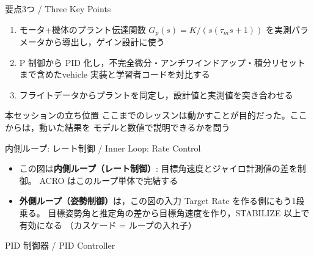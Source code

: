 \begin{frame}{要点3つ / Three Key Points}
  \begin{enumerate}
    \item モータ+機体のプラント伝達関数 $G_p(s) = K/(s(\tau_m s+1))$ を実測パラメータから導出し，ゲイン設計に使う
    \item P 制御から PID 化し，不完全微分・アンチワインドアップ・積分リセットまで含めたvehicle 実装と学習者コードを対比する
    \item フライトデータからプラントを同定し，設計値と実測値を突き合わせる
  \end{enumerate}

  \vspace{0.5em}

  \begin{alertblock}{本セッションの立ち位置}
    \small
    ここまでのレッスンは動かすことが目的だった。ここからは，動いた結果を
    モデルと数値で説明できるかを問う
  \end{alertblock}
\end{frame}

\begin{frame}{内側ループ: レート制御 / Inner Loop: Rate Control}
  \begin{center}
    \resizebox{0.85\textwidth}{!}{}
  \end{center}

  \vspace{0.5em}

  \begin{itemize}\small
    \item この図は\textbf{内側ループ（レート制御）}: 目標角速度とジャイロ計測値の差を制御。
          ACRO はこのループ単体で完結する
    \item \textbf{外側ループ（姿勢制御）}は，この図の入力 Target Rate を作る側にもう1段乗る。
          目標姿勢角と推定角の差から目標角速度を作り，STABILIZE 以上で有効になる
          （カスケード = ループの入れ子）
  \end{itemize}
\end{frame}

\begin{frame}{PID 制御器 / PID Controller}
  \begin{center}
    \resizebox{0.78\textwidth}{!}{}
  \end{center}
\end{frame}


